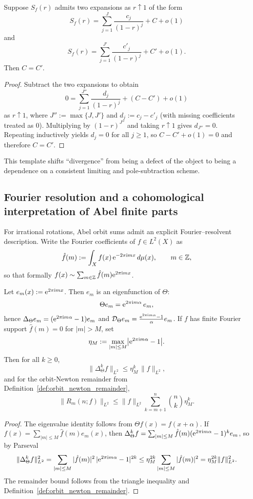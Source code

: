 \begin{lemma}
\label{lem:fp_unique}
Suppose $S_f(r)$ admits two expansions as $r\uparrow 1$ of the form
$$
S_f(r)=\sum_{j=1}^{J} \frac{c_j}{(1-r)^j} + C + o(1)
$$
and
$$
S_f(r)=\sum_{j=1}^{J'} \frac{c'_j}{(1-r)^j} + C' + o(1).
$$
Then $C=C'$.
\end{lemma}

\begin{proof}
Subtract the two expansions to obtain
$$
0=\sum_{j=1}^{J''}\frac{d_j}{(1-r)^j}+(C-C')+o(1)
$$
as $r\uparrow 1$, where $J'':=\max\{J,J'\}$ and $d_j:=c_j-c'_j$ (with missing coefficients treated as $0$).
Multiplying by $(1-r)^{J''}$ and taking $r\uparrow 1$ gives $d_{J''}=0$. Repeating inductively yields $d_j=0$ for all $j\ge 1$, so $C-C'+o(1)=0$ and therefore $C=C'$.
\end{proof}

This template shifts ``divergence'' from being a defect of the object to being a dependence on a consistent limiting and pole-subtraction scheme.

\subsection{Fourier resolution and a cohomological interpretation of Abel finite parts}
\label{subsec:abel_fourier}
For irrational rotations, Abel orbit sums admit an explicit Fourier--resolvent description.
Write the Fourier coefficients of $f\in L^2(X)$ as
$$
\hat f(m):=\int_X f(x)\,\mathrm{e}^{-2\pi\mathrm{i} m x}\,d\mu(x),\qquad m\in\mathbb{Z},
$$
so that formally $f(x)\sim\sum_{m\in\mathbb{Z}}\hat f(m)\mathrm{e}^{2\pi\mathrm{i} m x}$.

\begin{proposition}
\label{prop:fourier_symbol_remainder}
Let $e_m(x):=\mathrm{e}^{2\pi\mathrm{i} m x}$. Then $e_m$ is an eigenfunction of $\Theta$:
$$
\Theta e_m=\mathrm{e}^{2\pi\mathrm{i} m\alpha}\,e_m,
$$
hence $\Delta_\Theta e_m=(\mathrm{e}^{2\pi\mathrm{i} m\alpha}-1)e_m$ and $\mathcal{D}_\Theta e_m=\frac{\mathrm{e}^{2\pi\mathrm{i} m\alpha}-1}{\alpha}e_m$.
If $f$ has finite Fourier support $\hat f(m)=0$ for $|m|>M$, set
$$
\eta_M:=\max_{|m|\le M}\bigl|\mathrm{e}^{2\pi\mathrm{i} m\alpha}-1\bigr|.
$$
Then for all $k\ge 0$,
$$
\|\Delta_\Theta^k f\|_{L^2}\le \eta_M^k\,\|f\|_{L^2},
$$
and for the orbit-Newton remainder from Definition~\ref{def:orbit_newton_remainder},
$$
\|R_m(n;f)\|_{L^2}\le \|f\|_{L^2}\sum_{k=m+1}^{n}\binom{n}{k}\eta_M^k.
$$
\end{proposition}

\begin{proof}
The eigenvalue identity follows from $\Theta f(x)=f(x+\alpha)$.
If $f(x)=\sum_{|m|\le M}\hat f(m)e_m(x)$, then $\Delta_\Theta^k f=\sum_{|m|\le M}\hat f(m)(\mathrm{e}^{2\pi\mathrm{i} m\alpha}-1)^k e_m$, so by Parseval
$$
\|\Delta_\Theta^k f\|_{L^2}^2=\sum_{|m|\le M}|\hat f(m)|^2\,|\mathrm{e}^{2\pi\mathrm{i} m\alpha}-1|^{2k}\le \eta_M^{2k}\sum_{|m|\le M}|\hat f(m)|^2=\eta_M^{2k}\|f\|_{L^2}^2.
$$
The remainder bound follows from the triangle inequality and Definition~\ref{def:orbit_newton_remainder}.
\end{proof}

